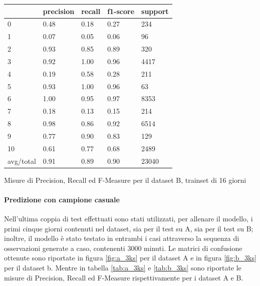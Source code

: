 \documentclass[10pt,a4paper]{article}
\begin{document}
	\begin{table}[!htbp]
    \scriptsize
    \centering
    	\begin{tabularx}{0.56\textwidth}{l | llll}
    		{} & {precision} & {recall} & {f1-score} & {support} \\
    		\midrule
            {0} & {0.48} & {0.18} & {0.27} & {234} \\
            {1} & {0.07} & {0.05} & {0.06} & {96} \\
            {2} & {0.93} & {0.85} & {0.89} & {320} \\
            {3} & {0.92} & {1.00} & {0.96} & {4417} \\
            {4} & {0.19} & {0.58} & {0.28} & {211} \\
            {5} & {0.93} & {1.00} & {0.96} & {63} \\
            {6} & {1.00} & {0.95} & {0.97} & {8353} \\
            {7} & {0.18} & {0.13} & {0.15} & {214} \\
            {8} & {0.98} & {0.86} & {0.92} & {6514} \\
            {9} & {0.77} & {0.90} & {0.83} & {129} \\
            {10} & {0.61} & {0.77} & {0.68} & {2489} \\
            {avg/total} & {0.91} & {0.89} & {0.90} & {23040} \\
    	\end{tabularx}
    	 {Misure di Precision, Recall ed F-Measure per il dataset B, trainset di 16 giorni}
    	\label{tab:b_16d}
    \end{table}
	
	\paragraph{Predizione con campione casuale}
	
	Nell'ultima coppia di test effettuati sono stati utilizzati, per allenare il modello, i primi cinque giorni contenuti nel dataset, sia per il test su A, sia per il test su B; inoltre, il modello è stato testato in entrambi i casi attraverso la sequenza di osservazioni generate a caso, contenenti 3000 minuti. Le matrici di confusione ottenute sono riportate in figura \ref{fig:a_3ks} per il dataset A e in figura \ref{fig:b_3ks} per il dataset b. Mentre in tabella \ref{tab:a_3ks} e \ref{tab:b_3ks} sono riportate le misure di Precision, Recall ed F-Measure rispettivamente per i dataset A e B.
	
\end{document}
